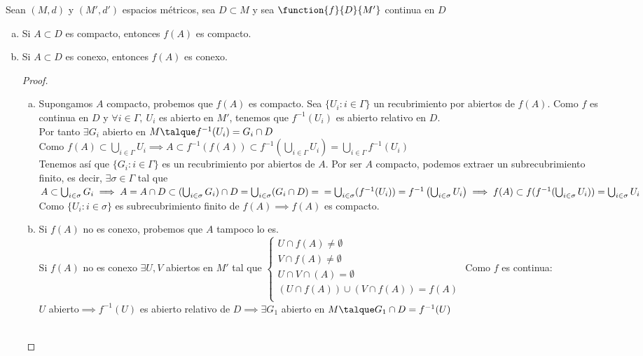 	\begin{proposicion} Sean $(M,d)$ y $(M',d')$ espacios métricos, sea $D\subset M$ y sea $\function{f}{D}{M'}$ continua en $D$
	\begin{enumerate}[a)]
	\item Si $A\subset D$ es compacto, entonces $f(A)$ es compacto.
	\item Si $A\subset D$ es conexo, entonces $f(A)$ es conexo.
	\begin{proof}\ 
	\begin{enumerate}[a)]
	\item Supongamos $A$ compacto, probemos que $f(A)$ es compacto. Sea $\{U_i:i\in\Gamma\}$ un recubrimiento por abiertos de $f(A)$. Como $f$ es continua en $D$ y $\forall i\in\Gamma,\ U_i$ es abierto en $M'$, tenemos que $f^{-1}(U_i)$ es abierto relativo en $D$.\\
	Por tanto $\exists G_i$ abierto en $M\talque f^{-1}(U_i)=G_i\cap D$\\
	Como $f(A)\subset \bigcup_{i\in\Gamma} U_i\implies A\subset f^{-1}(f(A))\subset f^{-1}(\bigcup_{i\in\Gamma} U_i)=\bigcup_{i\in\Gamma}f^{-1}(U_i)$\\
	Tenemos así que $\{G_i:i\in\Gamma\}$ es un recubrimiento por abiertos de $A$. Por ser $A$ compacto, podemos extraer un subrecubrimiento finito, es decir, $\exists\sigma\in\Gamma$ tal que $A\subset \bigcup_{i\in\sigma}G_i\implies A=A\cap D\subset(\bigcup_{i\in\sigma}G_i)\cap D=\bigcup_{i\in\sigma}(G_i\cap D)=\\
	=\bigcup_{i\in\sigma}(f^{-1}(U_i))=f^{-1}\left(\bigcup_{i\in\sigma}U_i\right)\implies f(A)\subset f(f^{-1}(\bigcup_{i\in\sigma}U_i))=\bigcup_{i\in\sigma} U_i$\\
	Como $\{U_i:i\in\sigma\}$ es subrecubrimiento finito de $f(A)\implies f(A)$ es compacto.
	\item Si $f(A)$ no es conexo, probemos que $A$ tampoco lo es.\\
	Si $f(A)$ no es conexo $\exists U,V$ abiertos en $M'$ tal que  $\left\{ \begin{array}{ll}
		U\cap f(A)\neq\emptyset \\
		V\cap f(A)\neq\emptyset\\
		U\cap V\cap(A) = \emptyset\\
		(U\cap f(A))\cup(V\cap f(A))=f(A) \\
		 	\end{array} \right.$
		Como $f$ es continua:\\
		$U$ abierto$\implies f^{-1}(U)$ es abierto relativo de $D\implies \exists G_1$ abierto en $M\talque G_1\cap D= f^{-1}(U)$ \\\\

\end{enumerate}
\end{proof}
\end{enumerate}
\end{proposicion}
